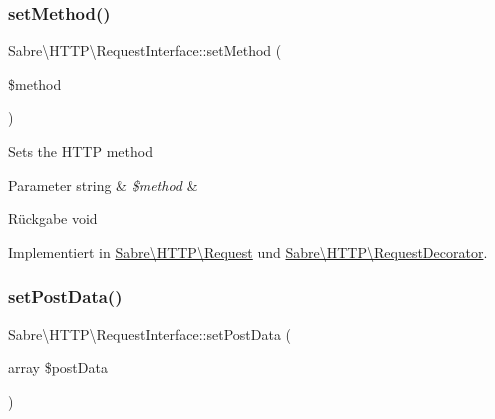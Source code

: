 \mbox{\label{interface_sabre_1_1_h_t_t_p_1_1_request_interface_a91dcec67206436b8439e0256b6388da0}} 
\subsubsection{\texorpdfstring{set\+Method()}{setMethod()}}
{\footnotesize\ttfamily Sabre\textbackslash{}\+H\+T\+T\+P\textbackslash{}\+Request\+Interface\+::set\+Method (\begin{DoxyParamCaption}\item[{}]{\$method }\end{DoxyParamCaption})}

Sets the H\+T\+TP method


\begin{DoxyParams}[1]{Parameter}
string & {\em \$method} & \\
\hline
\end{DoxyParams}
\begin{DoxyReturn}{Rückgabe}
void 
\end{DoxyReturn}


Implementiert in \mbox{\hyperlink{class_sabre_1_1_h_t_t_p_1_1_request_a1e8716f1a7f53cac328fdfbda42d35ed}{Sabre\textbackslash{}\+H\+T\+T\+P\textbackslash{}\+Request}} und \mbox{\hyperlink{class_sabre_1_1_h_t_t_p_1_1_request_decorator_a585f5ca3ea04942eb78b14a16ec48d46}{Sabre\textbackslash{}\+H\+T\+T\+P\textbackslash{}\+Request\+Decorator}}.

\mbox{\label{interface_sabre_1_1_h_t_t_p_1_1_request_interface_a4ba8b65d991c82677688a785a9d4014a}} 
\subsubsection{\texorpdfstring{set\+Post\+Data()}{setPostData()}}
{\footnotesize\ttfamily Sabre\textbackslash{}\+H\+T\+T\+P\textbackslash{}\+Request\+Interface\+::set\+Post\+Data (\begin{DoxyParamCaption}\item[{array}]{\$post\+Data }\end{DoxyParamCaption})}

